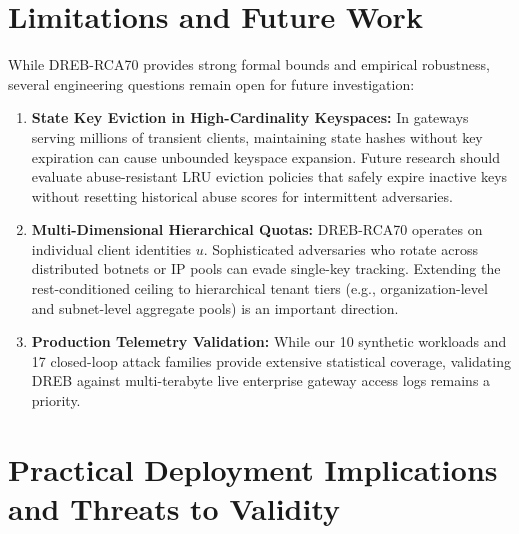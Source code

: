 \documentclass[conference]{IEEEtran}
\begin{document}
\section{Limitations and Future Work}
While DREB-RCA70 provides strong formal bounds and empirical robustness, several engineering questions remain open for future investigation:
\begin{enumerate}
    \item \textbf{State Key Eviction in High-Cardinality Keyspaces:} In gateways serving millions of transient clients, maintaining state hashes without key expiration can cause unbounded keyspace expansion. Future research should evaluate abuse-resistant LRU eviction policies that safely expire inactive keys without resetting historical abuse scores for intermittent adversaries.
    \item \textbf{Multi-Dimensional Hierarchical Quotas:} DREB-RCA70 operates on individual client identities $u$. Sophisticated adversaries who rotate across distributed botnets or IP pools can evade single-key tracking. Extending the rest-conditioned ceiling to hierarchical tenant tiers (e.g., organization-level and subnet-level aggregate pools) is an important direction.
    \item \textbf{Production Telemetry Validation:} While our 10 synthetic workloads and 17 closed-loop attack families provide extensive statistical coverage, validating DREB against multi-terabyte live enterprise gateway access logs remains a priority.
\end{enumerate}
\section{Practical Deployment Implications and Threats to Validity}
\end{document}
